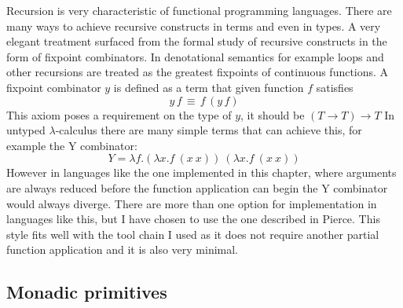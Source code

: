 \documentclass[12pt,twoside,notitlepage]{report}
\begin{document}
Recursion is very characteristic of functional programming languages. There are many ways to achieve recursive constructs in terms and even in types. A very elegant treatment surfaced from the formal study of recursive constructs in the form of fixpoint combinators. In denotational semantics for example loops and other recursions are treated as the greatest fixpoints of continuous functions. A fixpoint combinator $ y $ is defined as a term that given function $ f $ satisfies
\[ y\,f\,\equiv\, f\,(y\,f) \] 
This axiom poses a requirement on the type of $ y $, it should be $ (T \rightarrow T) \rightarrow T $
In untyped $ \lambda $-calculus there are many simple terms that can achieve this, for example the Y combinator:
\[ Y = \lambda f.(\lambda x.f\ (x\ x))\ (\lambda x.f\ (x\ x))  \]
However in languages like the one implemented in this chapter, where arguments are always reduced before the function application can begin the Y combinator would always diverge. There are more than one option for implementation in languages like this, but I have chosen to use the one described in Pierce\cite[p.~144]{pierce2002types}. This style fits well with the tool chain I used as it does not require another partial function application and it is also very minimal.
\subsection{Monadic primitives}
\end{document}
